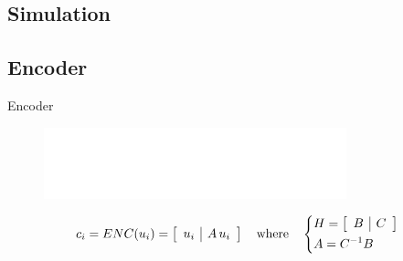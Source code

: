 \documentclass{beamer}
\begin{document}
\begin{darkframes}
  \section{Simulation}
  \subsection{Encoder}
  \begin{frame}{Encoder}
    \begin{figure}[h]
      \centering
      \includegraphics{figures/encoder.eps}
    \end{figure}
    \begin{equation*}
      c_i = ENC(u_i) =
      \left[
          \begin{array}[h]{c|c}
            u_i & A \, u_i
          \end{array}
        \right]
      \quad \text{where} \quad  \begin{dcases}
        H = \left[
          \begin{array}[h]{c|c}
            B & C
          \end{array}
        \right] \\
       A = C^{-1} B
      \end{dcases}
    \end{equation*}
  \end{frame}


\end{darkframes}
\end{document}

